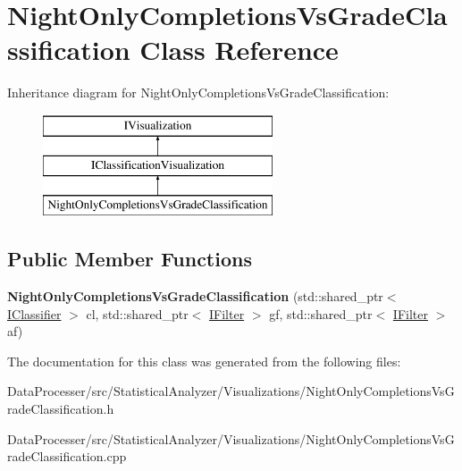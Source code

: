 \hypertarget{classNightOnlyCompletionsVsGradeClassification}{}\section{Night\+Only\+Completions\+Vs\+Grade\+Classification Class Reference}
\label{classNightOnlyCompletionsVsGradeClassification}
Inheritance diagram for Night\+Only\+Completions\+Vs\+Grade\+Classification\+:\begin{figure}[H]
\begin{center}
\leavevmode
\includegraphics[height=3.000000cm]{classNightOnlyCompletionsVsGradeClassification}
\end{center}
\end{figure}
\subsection*{Public Member Functions}
\begin{DoxyCompactItemize}
\item 
\mbox{\label{classNightOnlyCompletionsVsGradeClassification_a1f821edac48f28cd19d691bed21e41a3}} 
{\bfseries Night\+Only\+Completions\+Vs\+Grade\+Classification} (std\+::shared\+\_\+ptr$<$ \hyperlink{classIClassifier}{I\+Classifier} $>$ cl, std\+::shared\+\_\+ptr$<$ \hyperlink{classIFilter}{I\+Filter} $>$ gf, std\+::shared\+\_\+ptr$<$ \hyperlink{classIFilter}{I\+Filter} $>$ af)
\end{DoxyCompactItemize}


The documentation for this class was generated from the following files\+:\begin{DoxyCompactItemize}
\item 
Data\+Processer/src/\+Statistical\+Analyzer/\+Visualizations/Night\+Only\+Completions\+Vs\+Grade\+Classification.\+h\item 
Data\+Processer/src/\+Statistical\+Analyzer/\+Visualizations/Night\+Only\+Completions\+Vs\+Grade\+Classification.\+cpp\end{DoxyCompactItemize}
